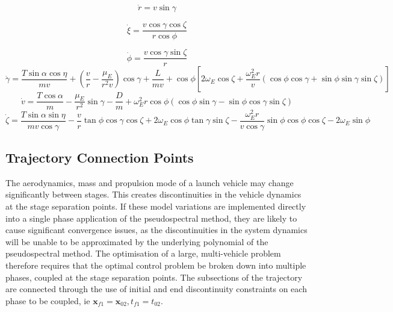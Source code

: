 \begin{equation}
\dot{r} = v \sin \gamma
\end{equation}

\begin{equation}
\dot{\xi} = \frac{v\cos \gamma \cos \zeta}{r \cos \phi}
\end{equation}

\begin{equation}
\dot{\phi} = \frac{v\cos\gamma\sin\zeta}{r}
\end{equation}
\begin{equation}
\dot{\gamma} = \frac{T\sin\alpha \cos\eta}{mv} + (\frac{v}{r}-\frac{\mu_E}{r^2 v})\cos\gamma + \frac{L}{mv}
+ \cos\phi[2\omega_E \cos\zeta + \frac{\omega_E^2 r}{v}(\cos\phi\cos\gamma+\sin\phi\sin\gamma\sin\zeta)]
\end{equation}
\begin{equation}
\dot{v} = \frac{T\cos\alpha}{m}-\frac{\mu_E}{r^2}\sin\gamma - \frac{D}{m}
+ \omega_E^2 r\cos\phi(\cos\phi\sin\gamma-\sin\phi\cos\gamma\sin\zeta)
\end{equation}
\begin{equation}
\dot{\zeta} = \frac{T\sin\alpha \sin\eta}{mv \cos \gamma}-\frac{v}{r}\tan\phi\cos\gamma\cos\zeta +2\omega_E\cos\phi\tan\gamma\sin\zeta - \frac{\omega_E^2 r}{v\cos\gamma}\sin\phi\cos\phi\cos\zeta-2\omega_E\sin\phi 
\end{equation}

\subsection{Trajectory Connection Points}

The aerodynamics, mass and propulsion mode of a launch vehicle may change significantly between stages. 
This creates discontinuities in the vehicle dynamics at the stage separation points. 
If these model variations are implemented directly into a single phase application of the pseudospectral method, they are likely to cause significant convergence issues, as the discontinuities in the system dynamics will be unable to be approximated by the underlying polynomial of the pseudospectral method. 
The optimisation of a large, multi-vehicle problem therefore requires that the optimal control problem be broken down into multiple phases, coupled at the stage separation points.
The subsections of the trajectory are connected through the use of initial and end discontinuity constraints on each phase to be coupled, ie $\textbf{x}_{f1} = \textbf{x}_{02}, t_{f1} = t_{02}$.

